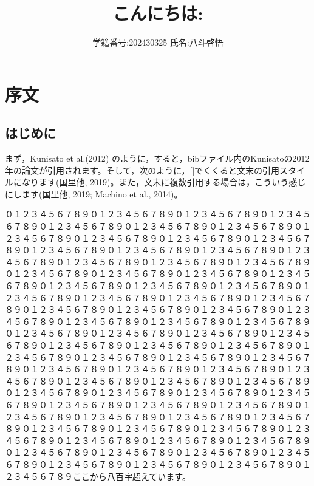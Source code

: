 \documentclass[12pt,a4paper,xelatex,ja=standard]{bxjsarticle}
\title{こんにちは:}
\author{学籍番号:202430325 氏名:八斗啓悟}
\date{}
\begin{document}
\pagestyle{empty}
\maketitle
\clearpage
{
\setcounter{tocdepth}{3}
\tableofcontents
}
\clearpage
\pagestyle{plain}
\setcounter{page}{1}

\section{序文}\label{ux5e8fux6587}

\subsection{はじめに}\label{ux306fux3058ux3081ux306b}

まず，Kunisato et al.(2012)
のように，すると，bibファイル内のKunisatoの2012年の論文が引用されます。そして，次のように，{[}{]}でくくると文末の引用スタイルになります(国里他,
2019)。また，文末に複数引用する場合は，こういう感じにします(国里他,
2019; Machino et al., 2014)。

\clearpage

０１２３４５６７８９０１２３４５６７８９０１２３４５６７８９０１２３４５６７８９０１２３４５６７８９０１２３４５６７８９０１２３４５６７８９０１２３４５６７８９０１２３４５６７８９０１２３４５６７８９０１２３４５６７８９０１２３４５６７８９０１２３４５６７８９０１２３４５６７８９０１２３４５６７８９０１２３４５６７８９０１２３４５６７８９０１２３４５６７８９０１２３４５６７８９０１２３４５６７８９０１２３４５６７８９０１２３４５６７８９０１２３４５６７８９０１２３４５６７８９０１２３４５６７８９０１２３４５６７８９０１２３４５６７８９０１２３４５６７８９０１２３４５６７８９０１２３４５６７８９０１２３４５６７８９０１２３４５６７８９０１２３４５６７８９０１２３４５６７８９０１２３４５６７８９０１２３４５６７８９０１２３４５６７８９０１２３４５６７８９０１２３４５６７８９０１２３４５６７８９０１２３４５６７８９０１２３４５６７８９０１２３４５６７８９０１２３４５６７８９０１２３４５６７８９０１２３４５６７８９０１２３４５６７８９０１２３４５６７８９０１２３４５６７８９０１２３４５６７８９０１２３４５６７８９０１２３４５６７８９０１２３４５６７８９０１２３４５６７８９０１２３４５６７８９０１２３４５６７８９０１２３４５６７８９０１２３４５６７８９０１２３４５６７８９０１２３４５６７８９０１２３４５６７８９０１２３４５６７８９０１２３４５６７８９０１２３４５６７８９０１２３４５６７８９０１２３４５６７８９０１２３４５６７８９０１２３４５６７８９０１２３４５６７８９０１２３４５６７８９０１２３４５６７８９０１２３４５６７８９０１２３４５６７８９０１２３４５６７８９０１２３４５６７８９０１２３４５６７８９０１２３４５６７８９０１２３４５６７８９０１２３４５６７８９０１２３４５６７８９ここから八百字超えています。
\end{document}
